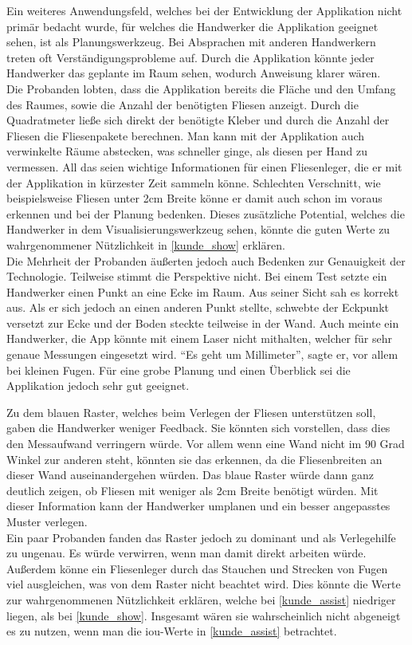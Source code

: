 Ein weiteres Anwendungsfeld, welches bei der Entwicklung der Applikation nicht primär bedacht wurde, für welches die Handwerker die Applikation geeignet sehen, ist als Planungswerkzeug. Bei Absprachen mit anderen Handwerkern treten oft Verständigungsprobleme auf. Durch die Applikation könnte jeder Handwerker das geplante im Raum sehen, wodurch Anweisung klarer wären. \\
Die Probanden lobten, dass die Applikation bereits die Fläche und den Umfang des Raumes, sowie die Anzahl der benötigten Fliesen anzeigt. Durch die Quadratmeter ließe sich direkt der benötigte Kleber und durch die Anzahl der Fliesen die Fliesenpakete berechnen. Man kann mit der Applikation auch verwinkelte Räume abstecken, was schneller ginge, als diesen per Hand zu vermessen. All das seien wichtige Informationen für einen Fliesenleger, die er mit der Applikation in kürzester Zeit sammeln könne. Schlechten Verschnitt, wie beispielsweise Fliesen unter 2cm Breite könne er damit auch schon im voraus erkennen und bei der Planung bedenken. Dieses zusätzliche Potential, welches die Handwerker in dem Visualisierungswerkzeug sehen, könnte die guten Werte zu wahrgenommener Nützlichkeit in \ref{kunde_show} erklären. \\
Die Mehrheit der Probanden äußerten jedoch auch Bedenken zur Genauigkeit der Technologie. Teilweise stimmt die Perspektive nicht. Bei einem Test setzte ein Handwerker einen Punkt an eine Ecke im Raum. Aus seiner Sicht sah es korrekt aus. Als er sich jedoch an einen anderen Punkt stellte, schwebte der Eckpunkt versetzt zur Ecke und der Boden steckte teilweise in der Wand. Auch meinte ein Handwerker, die App könnte mit einem Laser nicht mithalten, welcher für sehr genaue Messungen eingesetzt wird. \enquote{Es geht um Millimeter}, sagte er, vor allem bei kleinen Fugen. Für eine grobe Planung und einen Überblick sei die Applikation jedoch sehr gut geeignet.

Zu dem blauen Raster, welches beim Verlegen der Fliesen unterstützen soll, gaben die Handwerker weniger Feedback. Sie könnten sich vorstellen, dass dies den Messaufwand verringern würde. Vor allem wenn eine Wand nicht im 90 Grad Winkel zur anderen steht, könnten sie das erkennen, da die Fliesenbreiten an dieser Wand auseinandergehen würden. Das blaue Raster würde dann ganz deutlich zeigen, ob Fliesen mit weniger als 2cm Breite benötigt würden. Mit dieser Information kann der Handwerker umplanen und ein besser angepasstes Muster verlegen. \\
Ein paar Probanden fanden das Raster jedoch zu dominant und als Verlegehilfe zu ungenau. Es würde verwirren, wenn man damit direkt arbeiten würde. Außerdem könne ein Fliesenleger durch das Stauchen und Strecken von Fugen viel ausgleichen, was von dem Raster nicht beachtet wird. Dies könnte die Werte zur wahrgenommenen Nützlichkeit erklären, welche bei \ref{kunde_assist} niedriger liegen, als bei \ref{kunde_show}. Insgesamt wären sie wahrscheinlich nicht abgeneigt es zu nutzen, wenn man die iou-Werte in \ref{kunde_assist} betrachtet.

